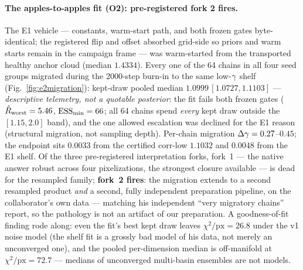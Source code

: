\paragraph{The apples-to-apples fit (O2): pre-registered fork 2 fires.}
The E1 vehicle --- constants, warm-start path, and both frozen gates
byte-identical; the registered flip and offset absorbed grid-side so
priors and warm starts remain in the campaign frame --- was warm-started
from the transported healthy anchor cloud (median $1.4334$). Every one of
the 64 chains in all four seed groups migrated during the 2000-step
burn-in to the same low-$\gamma$ shelf (Fig.~\ref{fig:e2migration}):
kept-draw pooled median $1.0999\,[1.0727,1.1103]$ --- \emph{descriptive
telemetry, not a quotable posterior}: the fit fails both frozen gates
($\hat{R}_{\rm worst}=5.46$, $\textrm{ESS}_{\min}=66$; all 64 chains spend
\emph{every} kept draw outside the $[1.15,2.0]$ band), and the one
allowed escalation was declined for the E1 reason (structural migration,
not sampling depth). Per-chain migration $\Delta\gamma=0.27$--$0.45$;
the endpoint sits $0.0033$ from the certified corr-low $1.1032$ and
$0.0048$ from the E1  shelf. Of the three pre-registered
interpretation forks, fork~1 --- the native answer robust across four
pixelizations, the strongest closure available --- is dead for the
resampled family; \textbf{fork~2 fires}: the migration extends to a
second resampled product \emph{and} a second, fully independent
preparation pipeline, on the collaborator's own data --- matching his
independent ``very migratory chains'' report, so the pathology is not an
artifact of our preparation. A goodness-of-fit finding rode along: even
the fit's best kept draw leaves $\chi^2/\mathrm{px}=26.8$ under the v1
noise model (the shelf fit is a grossly bad model of his data, not merely
an unconverged one), and the pooled per-dimension median is off-manifold
at $\chi^2/\mathrm{px}=72.7$ --- medians of unconverged multi-basin
ensembles are not models.

